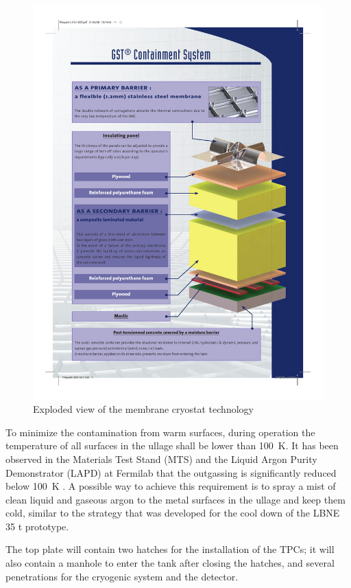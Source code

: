 \begin{figure}[htbp]
\begin{center}
\includegraphics[width=.9\textwidth]{figures/membrane-exploded-view}
\caption[Exploded view of the membrane cryostat technology]{ Exploded view of the membrane cryostat technology}
\label{fig:lar-org}
\end{center}
\end{figure}

To minimize the contamination from warm surfaces, during operation the temperature of all surfaces in the ullage shall be lower than 100~K. 
It has been observed in the Materials Test Stand (MTS) and the Liquid Argon Purity Demonstrator (LAPD) at Fermilab that the outgassing is significantly reduced below 100~K \cite{outgassing}. A possible way to achieve this requirement is to spray a mist of clean liquid and gaseous argon to the metal surfaces in the ullage and keep them cold, similar to the strategy that was developed for the cool down of the LBNE 35 t prototype.

The top plate will contain two hatches for the installation of the TPCs; it will also contain a manhole to enter the tank after closing the hatches, and several penetrations for the cryogenic system and the detector. 

